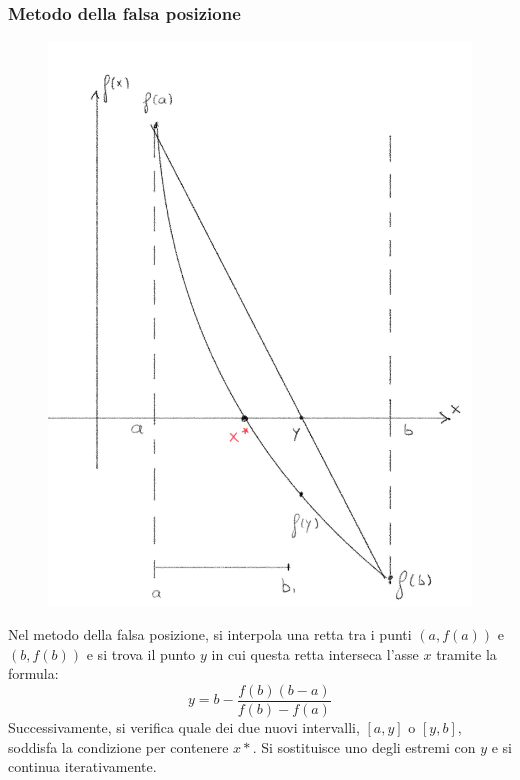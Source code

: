 \documentclass{article}
\begin{document}
\subsubsection{Metodo della falsa posizione}
\begin{figure}
    \includegraphics[width=0.9\linewidth]{false_position}
\end{figure}
Nel metodo della falsa posizione, si interpola una retta tra i punti $(a,f(a))$
e $(b,f(b))$ e si trova il punto $y$ in cui questa retta interseca l'asse $x$
tramite la formula:
$$y=b-\frac{f(b)(b-a)}{f(b)-f(a)}$$
Successivamente, si verifica quale dei due nuovi intervalli, $[a,y]$ o
$[y,b]$, soddisfa la condizione per contenere $x*$. Si sostituisce uno degli
estremi con $y$ e si continua iterativamente.
\end{document}
